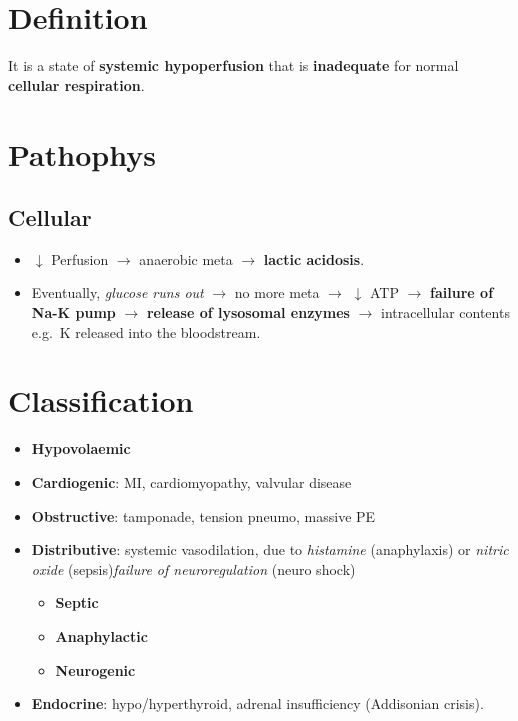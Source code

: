 \documentclass[
  12pt,
]{memoir}
\providecommand{\tightlist}{%
  \setlength{\itemsep}{0pt}\setlength{\parskip}{0pt}}
\begin{document}
\hypertarget{definition}{%
\section{Definition}\label{definition}}

It is a state of \textbf{systemic hypoperfusion} that is
\textbf{inadequate} for normal \textbf{cellular respiration}.

\hypertarget{pathophys}{%
\section{Pathophys}\label{pathophys}}

\hypertarget{cellular}{%
\subsection{Cellular}\label{cellular}}

\begin{itemize}
\tightlist
\item
  \(\downarrow\) Perfusion \(\rightarrow\) anaerobic meta
  \(\rightarrow\) \textbf{lactic acidosis}.
\item
  Eventually, \emph{glucose runs out} \(\rightarrow\) no more meta
  \(\rightarrow\) \(\downarrow\) ATP \(\rightarrow\) \textbf{failure of
  Na-K pump} \(\rightarrow\) \textbf{release of lysosomal enzymes}
  \(\rightarrow\) intracellular contents e.g.~K released into the
  bloodstream.
\end{itemize}

\hypertarget{classification}{%
\section{Classification}\label{classification}}

\begin{itemize}
\tightlist
\item
  \textbf{Hypovolaemic}
\item
  \textbf{Cardiogenic}: MI, cardiomyopathy, valvular disease
\item
  \textbf{Obstructive}: tamponade, tension pneumo, massive PE
\item
  \textbf{Distributive}: systemic vasodilation, due to \emph{histamine}
  (anaphylaxis) or \emph{nitric oxide} (sepsis)\emph{failure of
  neuroregulation} (neuro shock)

  \begin{itemize}
  \tightlist
  \item
    \textbf{Septic}
  \item
    \textbf{Anaphylactic}
  \item
    \textbf{Neurogenic}
  \end{itemize}
\item
  \textbf{Endocrine}: hypo/hyperthyroid, adrenal insufficiency
  (Addisonian crisis).
\end{itemize}
\end{document}
